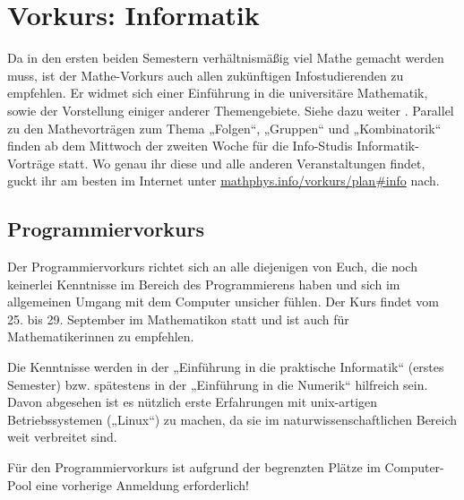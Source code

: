 \section{Vorkurs: Informatik}
\label{vkinfo}
Da in den ersten beiden Semestern verhältnismäßig viel Mathe gemacht werden muss, ist der Mathe-Vorkurs auch allen zukünftigen Infostudierenden zu empfehlen. Er widmet sich einer Einführung in die universitäre Mathematik, sowie der Vorstellung einiger anderer Themengebiete. Siehe dazu weiter
.
Parallel zu den Mathevorträgen zum Thema „Folgen“, „Gruppen“ und „Kombinatorik“ finden ab dem Mittwoch der zweiten Woche für die Info-Studis Informatik-Vorträge statt. Wo genau ihr diese und alle anderen Veranstaltungen findet, guckt ihr am besten im Internet unter \url{mathphys.info/vorkurs/plan\#info}  nach.


\parskip

\subsection{Programmiervorkurs}
Der Programmiervorkurs richtet sich an alle diejenigen von Euch, die noch keinerlei Kenntnisse im Bereich des Programmierens haben und sich im allgemeinen Umgang mit dem Computer unsicher fühlen. Der Kurs findet vom 25. bis 29. September im Mathematikon statt und ist auch für Mathematikerinnen zu empfehlen.

Die Kenntnisse werden in der „Einführung in die praktische Informatik“ (erstes Semester) bzw. spätestens in der „Einführung in die Numerik“ hilfreich sein. Davon abgesehen ist es nützlich erste Erfahrungen mit unix-artigen Betriebssystemen („Linux“) zu machen, da sie im naturwissenschaftlichen Bereich weit verbreitet sind.

Für den Programmiervorkurs ist aufgrund der begrenzten Plätze im Computer-Pool eine vorherige Anmeldung erforderlich!

